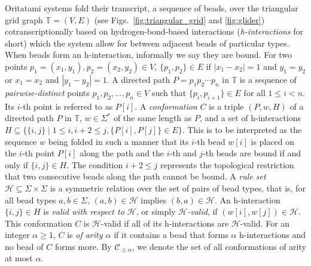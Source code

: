 \documentclass[dvipdfmx,review]{elsarticle}
\begin{document}
Oritatami systems fold their transcript, a sequence of beads, over the triangular grid graph $\mathbb{T} = (V, E)$ (see Figs.~\ref{fig:triangular_grid} and \ref{fig:glider}) cotranscriptionally based on hydrogen-bond-based interactions (\textit{h-interactions} for short) which the system allow for between adjacent beads of particular types. 
When beads form an h-interaction, informally we say they are bound. 
For two points $p_1 = (x_1, y_1), p_2 = (x_2, y_2) \in V$, $\{p_1, p_2\} \in E$ if $|x_1 - x_2| = 1$ and $y_1 = y_2$ or $x_1 = x_2$ and $|y_1 - y_2| = 1$. 
A directed path $P = p_1 p_2 \cdots p_n$ in $\mathbb{T}$ is a sequence of \textit{pairwise-distinct} points $p_1, p_2, \ldots, p_n \in V$ such that $\{p_i, p_{i+1}\} \in E$ for all $1 \leq i < n$.
Its $i$-th point is referred to as $P[i]$. 
A \textit{conformation} $C$ is a triple $(P, w, H)$ of a directed path $P$ in $\mathbb{T}$, $w \in \Sigma^*$ of the same length as $P$, and a set of h-interactions $H \subseteq \{\{i,j\} \mid 1 \leq i, i+2 \leq j, \{P[i], P[j]\} \in E\}$.
This is to be interpreted as the sequence $w$ being folded in such a manner that its $i$-th bead $w[i]$ is placed on the $i$-th point $P[i]$ along the path and the $i$-th and $j$-th beads are bound if and only if $\{i, j\} \in H$. 
The condition $i+2 \leq j$ represents the topological restriction that two consecutive beads along the path cannot be bound.
A \textit{rule set} $\mathcal{H} \subseteq \Sigma \times \Sigma$ is a symmetric relation over the set of pairs of bead types, that is, for all bead types $a, b \in \Sigma$, $(a, b) \in \mathcal{H}$ implies $(b, a) \in \mathcal{H}$. 
An h-interaction $\{i, j\} \in H$ is \textit{valid with respect to $\mathcal{H}$}, or simply \textit{$\mathcal{H}$-valid}, if $(w[i], w[j]) \in \mathcal{H}$. 
This conformation $C$ is $\mathcal{H}$-valid if all of its h-interactions are $\mathcal{H}$-valid. 
For an integer $\alpha \ge 1$, $C$ is \textit{of arity $\alpha$} if it contains a bead that forms $\alpha$ h-interactions and no bead of $C$ forms more. 
By $\mathcal{C}_{\le \alpha}$, we denote the set of all conformations of arity at most $\alpha$.
\end{document}
